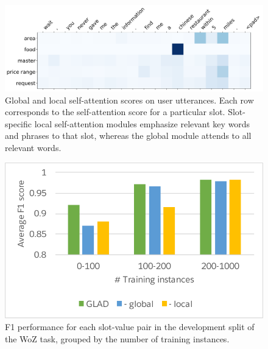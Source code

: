 \documentclass[11pt,a4paper]{article}
\begin{document}
\begin{figure}[t]
\centering
\includegraphics[width=0.9\linewidth]{figures/attn2.pdf}
\caption{
Global and local self-attention scores on user utterances.
Each row corresponds to the self-attention score for a particular slot.
Slot-specific local self-attention modules emphasize relevant key words and phrases to that slot, whereas the global module attends to all relevant words.
}
\label{fig:selfattn}
\vspace{-0.2cm}
\end{figure}
















\begin{figure}[t]
\centering
\includegraphics[width=\linewidth]{figures/rarity.pdf}
\caption{
F1 performance for each slot-value pair in the development split of the WoZ task, grouped by the number of training instances.
}
\label{fig:rarity}
\vspace{-0.2cm}
\end{figure}
\end{document}
